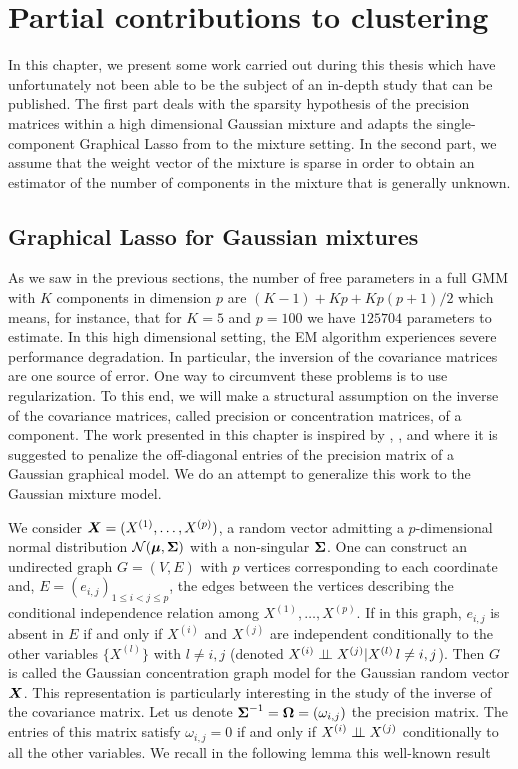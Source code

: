 
\chapter{Partial contributions to clustering}\label{chap:contributions}
In this chapter, we present some work carried out during this thesis which have unfortunately not been able to be the subject of an in-depth study that can be published. The first part deals with the sparsity hypothesis of the precision matrices within a high dimensional Gaussian mixture and adapts the single-component Graphical Lasso from \citep{glasso07} to the mixture setting. In the second part, we assume that the weight vector of the mixture is sparse in order to obtain an estimator of the number of components in the mixture that is generally unknown. 

\section{Graphical Lasso for Gaussian mixtures}\label{chapgraphlasso}
As we saw in the previous sections, the number of free parameters in a full GMM with $K$ components in dimension $p$ are $(K-1)+Kp+Kp(p+1)/2$ which means, for instance, that for $K=5$ and $p=100$ we have $125704$ parameters to estimate. In this high dimensional setting, the EM algorithm experiences severe performance degradation. In particular, the inversion of the covariance matrices are one source of error. One way to circumvent these problems is to use regularization. To this end, we will make a structural assumption on the inverse of the covariance matrices, called precision or concentration matrices, of a component. The work presented in this chapter is inspired by \citep{glasso07}, \citep{banerjee}, \citep{yuanLin_graph} and \citep{meinshausen2006} where it is suggested to penalize the off-diagonal entries of the precision matrix of a Gaussian graphical model. We do an attempt to generalize this work to the Gaussian mixture model.

We consider $\boldsymbol X=(X^{(1)},\dots,X^{(p)})$, a random vector admitting a $p$-dimensional normal distribution $\mathcal N(\boldsymbol\mu, \boldsymbol\Sigma)$ with a non-singular $\boldsymbol\Sigma$. One can construct an undirected graph $G=(V,E)$ with $p$ vertices corresponding to each coordinate and, $E=(e_{i,j})_{1\leq i < j \leq p}$, the edges between the vertices describing the conditional independence relation among $X^{(1)},\dots,X^{(p)}$. If in this graph, $e_{i,j}$ is absent in $E$ if and only if $X^{(i)}$ and $X^{(j)}$ are independent conditionally to the other variables $\{X^{(l)}\}$ with $l\neq i,j$ (denoted $X^{(i)} \perp\!\!\!\perp X^{(j)}|X^{(l)}\, l\neq i,j$). Then $G$ is called the Gaussian concentration graph model for the Gaussian random vector $\boldsymbol X$. 
This representation is particularly interesting in the study of the inverse of the covariance matrix. Let us denote $\boldsymbol\Sigma^{-1}=\boldsymbol\Omega=(\omega_{i,j})$ the precision matrix. The entries of this matrix satisfy $\omega_{i,j}=0$ if and only if $X^{(i)} \perp\!\!\!\perp X^{(j)}$ conditionally to all the other variables. We recall in the following lemma this well-known result

